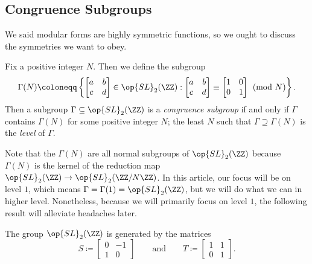 \documentclass{amsart}
\begin{document}
\subsection{Congruence Subgroups}
We said modular forms are highly symmetric functions, so we ought to discuss the symmetries we want to obey.
\begin{definition}
	Fix a positive integer $N$. Then we define the subgroup
	\[\Gamma(N)\coloneqq\left\{\begin{bmatrix}
		a & b \\
		c & d
	\end{bmatrix}\in\op{SL}_2(\ZZ):\begin{bmatrix}
		a & b \\
		c & d
	\end{bmatrix}\equiv\begin{bmatrix}
		1 & 0 \\
		0 & 1
	\end{bmatrix}\pmod N\right\}.\]
	Then a subgroup $\Gamma\subseteq\op{SL}_2(\ZZ)$ is a \textit{congruence subgroup} if and only if $\Gamma$ contains $\Gamma(N)$ for some positive integer $N$; the least $N$ such that $\Gamma\supseteq\Gamma(N)$ is the \textit{level} of $\Gamma$.
\end{definition}
Note that the $\Gamma(N)$ are all normal subgroups of $\op{SL}_2(\ZZ)$ because $\Gamma(N)$ is the kernel of the reduction map $\op{SL}_2(\ZZ)\to\op{SL}_2(\ZZ/N\ZZ)$. In this article, our focus will be on level $1$, which means $\Gamma=\Gamma(1)=\op{SL}_2(\ZZ)$, but we will do what we can in higher level. Nonetheless, because we will primarily focus on level $1$, the following result will alleviate headaches later.
\begin{proposition} \label{prop:gens-for-sl2z}
	The group $\op{SL}_2(\ZZ)$ is generated by the matrices
	\[S\coloneqq\begin{bmatrix}
		0 & -1 \\
		1 & 0
	\end{bmatrix}\qquad\text{and}\qquad T\coloneqq\begin{bmatrix}
		1 & 1 \\
		0 & 1
	\end{bmatrix}.\]
\end{proposition}
\end{document}

